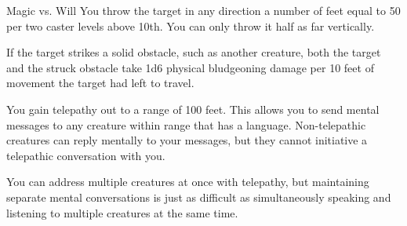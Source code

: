 \begin{spellheader}
    \begin{spelltargetinginfo}
    \end{spelltargetinginfo}
    \begin{spelleffects}
    \end{spelleffects}
\end{spellheader}
\begin{spellcontent}
    \begin{spellattack}{Magic vs. Will}
        \spellsuccess You throw the target in any direction a number of feet equal to 50  per two caster levels above 10th. You can only throw it half as far vertically.

        If the target strikes a solid obstacle, such as another creature, both the target and the struck obstacle take 1d6 physical bludgeoning damage per 10 feet of movement the target had left to travel.
    \end{spellattack}
\end{spellcontent}
\begin{spellfooter}

\end{spellfooter}

\begin{spellheader}
    \begin{spelltargetinginfo}
    \end{spelltargetinginfo}
    \begin{spelleffects}
    \end{spelleffects}
\end{spellheader}
\begin{spellcontent}
    \spelleffect You gain telepathy out to a range of 100 feet. This allows you to send mental messages to any creature within range that has a language. Non-telepathic creatures can reply mentally to your messages, but they cannot initiative a telepathic conversation with you.

    You can address multiple creatures at once with telepathy, but maintaining separate mental conversations is just as difficult as simultaneously speaking and listening to multiple creatures at the same time. 
    \spelldur{\durlong}
\end{spellcontent}
\begin{spellfooter}

\end{spellfooter}


